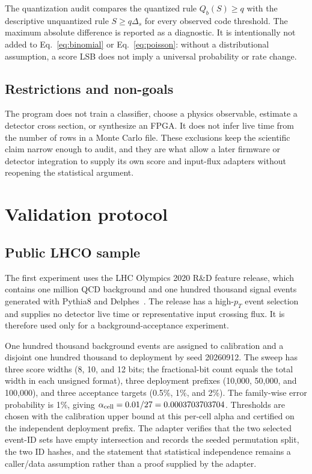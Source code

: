 \documentclass[preprint,12pt]{elsarticle}
\begin{document}
The quantization audit compares the quantized rule $Q_b(S)\ge q$ with the
descriptive unquantized rule $S\ge q\Delta_s$ for every observed code
threshold.  The maximum absolute difference is reported as a diagnostic.  It
is intentionally not added to Eq.~\eqref{eq:binomial} or Eq.~\eqref{eq:poisson}:
without a distributional assumption, a score LSB does not imply a universal
probability or rate change.

\subsection{Restrictions and non-goals}

The program does not train a classifier, choose a physics observable, estimate
a detector cross section, or synthesize an FPGA.  It does not infer live time
from the number of rows in a Monte Carlo file.  These exclusions keep the
scientific claim narrow enough to audit, and they are what allow a later
firmware or detector integration to supply its own score and input-flux
adapters without reopening the statistical argument.

\section{Validation protocol}
\label{sec:validation}

\subsection{Public LHCO sample}

The first experiment uses the LHC Olympics 2020 R\&D feature release, which
contains one million QCD background and one hundred thousand signal events
generated with Pythia8 and Delphes~\cite{Kasieczka2021LHCO,LHCO2020RND,
Sjostrand2015Pythia,deFavereau2014Delphes}.  The release has a high-$p_T$ event
selection and supplies no detector live time or representative input crossing
flux.  It is therefore used only for a background-acceptance experiment.

One hundred thousand background events are assigned to calibration and a
disjoint one hundred thousand to deployment by seed 20260912.  The sweep has
three score widths (8, 10, and 12 bits; the fractional-bit count equals the
total width in each unsigned format), three deployment prefixes (10,000,
50,000, and 100,000), and three
acceptance targets (0.5\%, 1\%, and 2\%).  The family-wise error probability is
1\%, giving $\alpha_{\rm cell}=0.01/27=0.0003703703704$.  Thresholds are chosen
with the calibration upper bound at this per-cell alpha and certified on the
independent deployment prefix.  The adapter verifies that the two selected
event-ID sets have empty intersection and records the seeded permutation split,
the two ID hashes, and the statement that statistical independence remains a
caller/data assumption rather than a proof supplied by the adapter.
\end{document}
